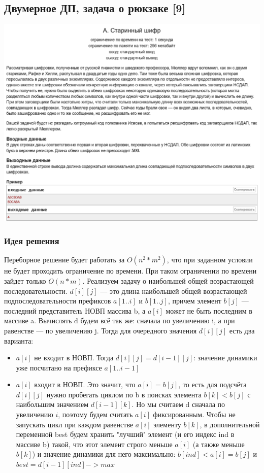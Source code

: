 \subsection*{ Двумерное ДП, задача о рюкзаке [9]}
\begin{center}
\includegraphics[width=\textwidth]{11A.png}
\end{center}
\subsubsection*{Идея решения}
Переборное решение будет работать за $O(n^2 * m^2)$, что при заданном условии не будет проходить ограничение по времени. При таком ограничении по времени зайдет только $O(n*m)$. Реализуем задачу о наибольшей общей возрастающей последовательности. $d[i][j]$ — это длина наибольшей общей возрастающей подпоследовательности префиксов $a[1..i]$ и $b[1..j]$, причем элемент $b[j]$ — последний представитель НОВП массива b, а $a[i]$ может не быть последним в массиве a. Вычислять d будем всё так же: сначала по увеличению i, а при равенстве — по увеличению j. Тогда для очередного значения $d[i][j]$ есть два варианта: 
\begin{itemize}
\item $a[i]$ не входит в НОВП. Тогда $d[i][j] = d[i-1][j]$: значение динамики уже посчитано на префиксе $a[1..i-1]$
\item $a[i]$ входит в НОВП. Это значит, что $a[i]=b[j]$, то есть для подсчёта $d[i][j]$ нужно пробегать циклом по b в поисках элемента $b[k]<b[j]$ с наибольшим значением $d[i-1][k]$. Но мы считаем d сначала по увеличению $i$, поэтому будем считать $a[i]$ фиксированным. Чтобы не запускать цикл при каждом равенстве $a[i]$ элементу $b[k]$, в дополнительной переменной best будем хранить "лучший" элемент (и его индекс ind в массиве b) такой, что этот элемент строго меньше $a[i]$ (а также меньше $b[k]$) и значение динамики для него максимально: $b[ind]<a[i]=b[j]$ и $best=d[i-1][ind] -> max$
\end{itemize}
